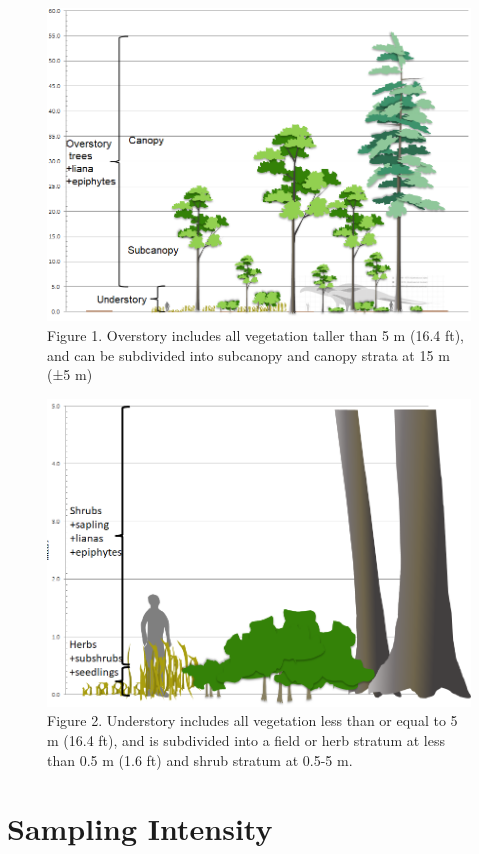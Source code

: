 \documentclass[
]{book}
\begin{document}
\begin{figure}
\centering
\includegraphics{static-figures/overstory.png}
\caption{Figure 1. Overstory includes all vegetation taller than 5 m (16.4 ft), and can be subdivided into subcanopy and canopy strata at 15 m (±5 m)}
\end{figure}

\begin{figure}
\centering
\includegraphics{static-figures/understory.png}
\caption{Figure 2. Understory includes all vegetation less than or equal to 5 m (16.4 ft), and is subdivided into a field or herb stratum at less than 0.5 m (1.6 ft) and shrub stratum at 0.5-5 m.}
\end{figure}

\hypertarget{sampling-intensity}{%
\chapter{Sampling Intensity}\label{sampling-intensity}}
\end{document}
